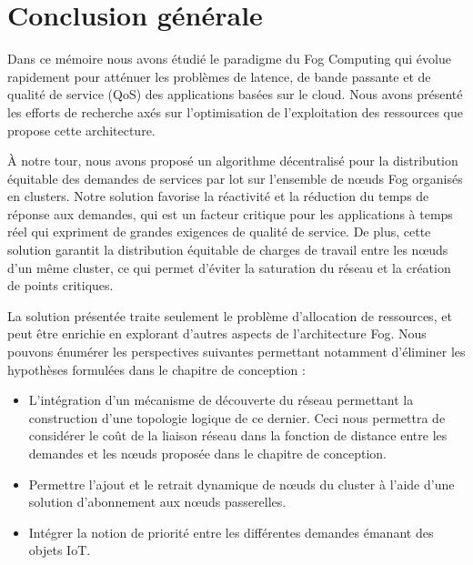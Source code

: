 \chapter{Conclusion générale}
\thispagestyle{fancy}
Dans ce mémoire nous avons étudié le paradigme du Fog Computing qui évolue rapidement pour atténuer les problèmes de latence, de bande passante et de qualité de service (QoS) des applications basées sur le cloud. Nous avons présenté les efforts de recherche axés sur l'optimisation de l'exploitation des ressources que propose cette architecture.\par
À notre tour, nous avons proposé un algorithme décentralisé pour la distribution équitable des demandes de services par lot sur l'ensemble de nœuds Fog organisés en clusters. Notre solution favorise la réactivité et la réduction du temps de réponse aux demandes, qui est un facteur critique pour les applications à temps réel qui expriment de grandes exigences de qualité de service. De plus, cette solution garantit la distribution équitable de charges de travail entre les nœuds d'un même cluster, ce qui permet d'éviter la saturation du réseau et la création de points critiques.\par
La solution présentée traite seulement le problème d'allocation de ressources, et peut être enrichie en explorant d'autres aspects de l'architecture Fog. Nous pouvons énumérer les perspectives suivantes permettant notamment d'éliminer les hypothèses formulées dans le chapitre de conception :
\begin{itemize}
  \item L'intégration d'un mécanisme de découverte du réseau permettant la construction d'une topologie logique de ce dernier. Ceci nous permettra de considérer le coût de la liaison réseau dans la fonction de distance entre les demandes et les nœuds proposée dans le chapitre de conception.
  \item Permettre l'ajout et le retrait dynamique de nœuds du cluster à l'aide d'une solution d'abonnement aux nœuds passerelles.
  \item Intégrer la notion de priorité entre les différentes demandes émanant des objets IoT. 
\end{itemize}